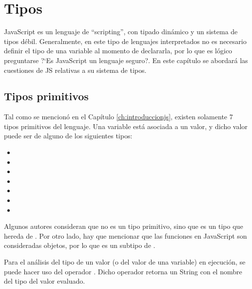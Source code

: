 
\chapter{Tipos} %

\label{ch:tipos} %


JavaScript es un lenguaje de "`scripting"', con tipado dinámico y un sistema de tipos débil. Generalmente, en este tipo de lenguajes interpretados no es necesario definir el tipo de una variable al momento de declararla, por lo que es lógico preguntarse ?`Es JavaScript un lenguaje seguro?. En este capítulo se abordará las cuestiones de JS relativas a su sistema de tipos.


\section{Tipos primitivos}

Tal como se mencionó en el Capítulo \ref{ch:introduccionjs}, existen solamente 7 tipos primitivos del lenguaje. Una variable está asociada a un valor, y dicho valor puede ser de alguno de los siguientes tipos:

\begin{itemize}
\item {}
\item {}
\item {}
\item {}
\item {}
\item {}
\item {}
\end{itemize}

Algunos autores consideran que  no es un tipo primitivo, sino que es un tipo que hereda de . Por otro lado, hay que mencionar que las funciones en JavaScript son consideradas objetos, por lo que  es un subtipo de .

Para el análisis del tipo de un valor (o del valor de una variable) en ejecución, se puede hacer uso del operador . Dicho operador retorna un String con el nombre del tipo del valor evaluado.

